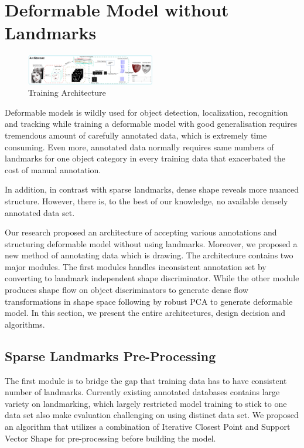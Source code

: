 \section{Deformable Model without Landmarks}

\begin{figure}[h!]
    \centering
        \includegraphics[width=0.5\textwidth]{resources/architecture}
    \caption{Training Architecture}
    \label{fig:archi}
\end{figure}

Deformable models is wildly used for object detection, localization, recognition and tracking while training a deformable model with good generalisation requires tremendous amount of carefully annotated data, which is extremely time consuming. Even more, annotated data normally requires same numbers of landmarks for one object category in every training data that exacerbated the cost of manual annotation. 

In addition, in contrast with sparse landmarks, dense shape reveals more nuanced structure. However, there is, to the best of our knowledge, no available densely annotated data set.

Our research proposed an architecture of accepting various annotations and structuring deformable model without using landmarks. Moreover, we proposed a new method of annotating data which is drawing. The architecture contains two major modules. The first modules handles inconsistent annotation set by converting to landmark independent shape discriminator. While the other module produces shape flow on object discriminators to generate dense flow transformations in shape space following by robust PCA\cite{?} to generate deformable model. In this section, we present the entire architectures, design decision and algorithms.

\subsection{Sparse Landmarks Pre-Processing}
The first module is to bridge the gap that training data has to have consistent number of landmarks. Currently existing annotated databases contains large variety on landmarking, which largely restricted model training to stick to one data set also make evaluation challenging on using distinct data set. We proposed an algorithm that utilizes a combination of Iterative Closest Point and Support Vector Shape for pre-processing before building the model.

